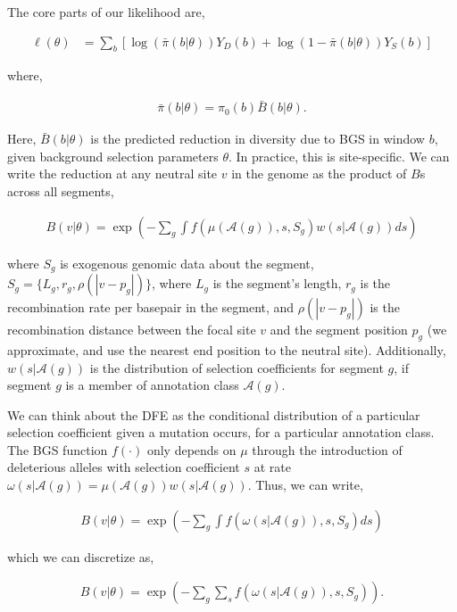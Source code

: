 \documentclass[11pt]{article}
\begin{document}
The core parts of our likelihood are,

\begin{align}
  \ell(\theta) &=  \sum_b [\log(\bar{\pi}(b | \theta)) Y_D(b) + \log(1-\bar{\pi}(b | \theta)) Y_S(b)]
\end{align}

where,

\begin{align}
  \bar{\pi}(b |\theta) = \pi_0(b) \bar{B}(b | \theta).
\end{align}

Here, $\bar{B}(b | \theta)$ is the predicted reduction in diversity due to BGS
in window $b$, given background selection parameters $\theta$. In practice,
this is site-specific. We can write the reduction at any neutral site $v$ in
the genome as the product of $B$s across all segments, 

\begin{align}
  B(v | \theta) = \exp\left(- \sum_g \int f(\mu(\mathcal{A}(g)), s, S_g) w(s|\mathcal{A}(g)) ds \right)
\end{align}

where $S_g$ is exogenous genomic data about the segment, $S_g = \{L_g, r_g,
\rho(|v-p_g|)\}$, where $L_g$ is the segment's length, $r_g$ is the
recombination rate per basepair in the segment, and $\rho(|v-p_g|)$ is the
recombination distance between the focal site $v$ and the segment position
$p_g$ (we approximate, and use the nearest end position to the neutral site).
Additionally, $w(s|\mathcal{A}(g))$ is the distribution of selection
coefficients for segment $g$, if segment $g$ is a member of annotation class
$\mathcal{A}(g)$.

We can think about the DFE as the conditional distribution of a particular
selection coefficient given a mutation occurs, for a particular annotation
class. The BGS function $f(\cdot)$ only depends on $\mu$ through the
introduction of deleterious alleles with selection coefficient $s$ at rate
$\omega(s|\mathcal{A}(g)) = \mu(\mathcal{A}(g)) w(s | \mathcal{A}(g))$. Thus,
we can write, 

\begin{align}
  B(v | \theta) = \exp\left(- \sum_g \int f(\omega(s|\mathcal{A}(g)), s, S_g) ds \right)
\end{align}


which we can discretize as,

\begin{align}
  B(v | \theta) = \exp\left(- \sum_g \sum_s f(\omega(s|\mathcal{A}(g)), s, S_g) \right).
\end{align}
\end{document}
